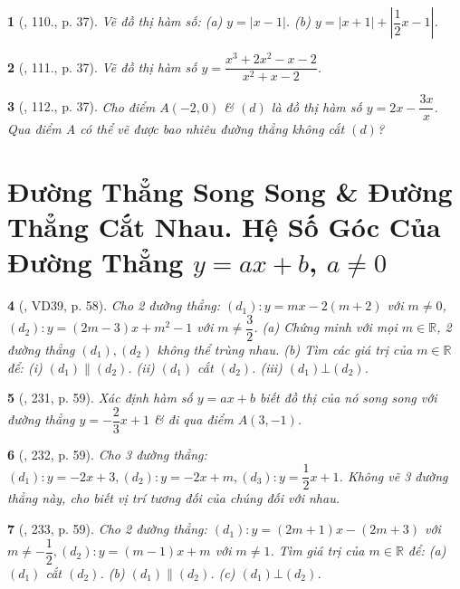 \documentclass{article}
\newtheorem{baitoan}{}
\begin{document}
\begin{baitoan}[\cite{Tuyen_Toan_9_old}, 110., p. 37]
	Vẽ đồ thị hàm số: (a) $y = |x - 1|$. (b) $y = |x + 1| + \left|\dfrac{1}{2}x - 1\right|$.
\end{baitoan}

\begin{baitoan}[\cite{Tuyen_Toan_9_old}, 111., p. 37]
	Vẽ đồ thị hàm số $y = \dfrac{x^3 + 2x^2 - x - 2}{x^2 + x - 2}$.
\end{baitoan}

\begin{baitoan}[\cite{Tuyen_Toan_9_old}, 112., p. 37]
	Cho điểm $A(-2,0)$ \& $(d)$ là đồ thị hàm số $y = 2x - \dfrac{3x}{x}$. Qua điểm A có thể vẽ được bao nhiêu đường thẳng không cắt $(d)$?
\end{baitoan}


\section{Đường Thẳng Song Song \& Đường Thẳng Cắt Nhau. Hệ Số Góc Của Đường Thẳng $y = ax + b$, $a\ne0$}

\begin{baitoan}[\cite{Tuyen_Toan_8}, VD39, p. 58]
	Cho 2 đường thẳng: $(d_1):y = mx - 2(m + 2)$ với $m\ne0$, $(d_2):y = (2m - 3)x + m^2 - 1$ với $m\ne\dfrac{3}{2}$. (a) Chứng minh với mọi $m\in\mathbb{R}$, 2 đường thẳng $(d_1),(d_2)$ không thể trùng nhau. (b) Tìm các giá trị của $m\in\mathbb{R}$ để: (i) $(d_1)\parallel(d_2)$. (ii) $(d_1)$ cắt $(d_2)$. (iii) $(d_1)\bot(d_2)$.
\end{baitoan}

\begin{baitoan}[\cite{Tuyen_Toan_8}, 231, p. 59]
	Xác định hàm số $y = ax + b$ biết đồ thị của nó song song với đường thẳng $y = -\dfrac{2}{3}x + 1$ \& đi qua điểm $A(3,-1)$.
\end{baitoan}

\begin{baitoan}[\cite{Tuyen_Toan_8}, 232, p. 59]
	Cho 3 đường thẳng: $(d_1):y = -2x + 3,(d_2):y = -2x + m,(d_3):y = \dfrac{1}{2}x + 1$. Không vẽ 3 đường thẳng này, cho biết vị trí tương đối của chúng đối với nhau.
\end{baitoan}

\begin{baitoan}[\cite{Tuyen_Toan_8}, 233, p. 59]
	Cho 2 đường thẳng: $(d_1):y = (2m + 1)x - (2m + 3)$ với $m\ne-\dfrac{1}{2},(d_2):y = (m - 1)x + m$ với $m\ne1$. Tìm giá trị của $m\in\mathbb{R}$ để: (a) $(d_1)$ cắt $(d_2)$. (b) $(d_1)\parallel(d_2)$. (c) $(d_1)\bot(d_2)$.
\end{baitoan}
\end{document}
